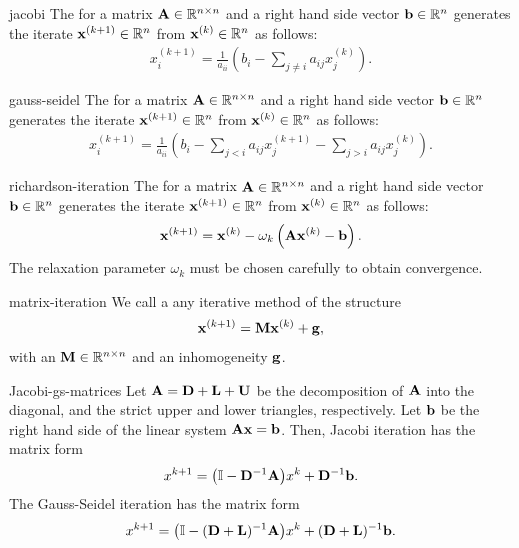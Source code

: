 
\begin{Definition}{jacobi}
  The  for a matrix $\mathbf A\in\mathbb R^{n\times n}$ and a
  right hand side vector $\mathbf b\in \mathbb R^n$ generates the iterate
  $\mathbf x^{(k+1)}\in \mathbb R^n$ from $\mathbf x^{(k)}\in \mathbb R^n$ as follows:
  \begin{gather}
     x^{(k+1)}_i = \frac1{a_{ii}}\left( b_i - \sum_{j\neq i} a_{ij}x^{(k)}_j\right).
  \end{gather}
\end{Definition}

\begin{Definition}{gauss-seidel}
  The  for a matrix $\mathbf A\in\mathbb R^{n\times n}$ and a
  right hand side vector $\mathbf b\in \mathbb R^n$ generates the iterate
  $\mathbf x^{(k+1)}\in \mathbb R^n$ from $\mathbf x^{(k)}\in \mathbb R^n$ as follows:
  \begin{gather}
    x^{(k+1)}_i = \frac1{a_{ii}}
    \left( b_i
      - \sum_{j< i} a_{ij}x^{(k+1)}_j
      - \sum_{j> i} a_{ij}x^{(k)}_j
  \right).
  \end{gather}
\end{Definition}

\begin{Definition}{richardson-iteration}
  The  for a matrix $\mathbf A\in\mathbb R^{n\times n}$ and a
  right hand side vector $\mathbf b\in \mathbb R^n$ generates the iterate
  $\mathbf x^{(k+1)}\in \mathbb R^n$ from $\mathbf x^{(k)}\in \mathbb R^n$ as follows:
  \begin{gather}
    \mathbf x^{(k+1)} = \mathbf x^{(k)} - 
    \omega_k\left( \mathbf A\mathbf x^{(k)} - \mathbf b
  \right).
\end{gather}
The relaxation parameter $\omega_k$ must be chosen carefully to obtain
convergence.
\end{Definition}

\begin{Definition}{matrix-iteration}
  We call a  any iterative method of the structure
  \begin{gather}
    \mathbf x^{(k+1)} = \mathbf M \mathbf x^{(k)} + \mathbf g,
  \end{gather}
  with an  $\mathbf M\in\mathbb R^{n\times n}$ and an inhomogeneity $\mathbf g$.
\end{Definition}

\begin{Lemma}{Jacobi-gs-matrices}
  Let $\mathbf A = \mathbf D +\mathbf L+\mathbf U$ be the decomposition of $\mathbf A$
  into the diagonal, and the strict upper and lower triangles,
  respectively. Let $\mathbf b$ be the right hand side of the linear system
  $\mathbf A\mathbf x=\mathbf b$. Then, Jacobi iteration has the matrix form
  \begin{gather}
    x^{k+1} = \bigl(\mathbb I-\mathbf D^{-1}\mathbf A\bigr) x^{k} + \mathbf D^{-1} \mathbf b.
  \end{gather}
  The Gauss-Seidel iteration has the matrix form
  \begin{gather}
    x^{k+1} = \bigl(\mathbb I-(\mathbf D+\mathbf L)^{-1}\mathbf A\bigr) x^{k} + (\mathbf D+\mathbf L)^{-1} \mathbf b.
  \end{gather}
\end{Lemma}

